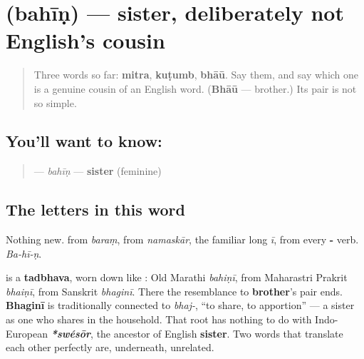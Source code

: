 \section[\texorpdfstring{\mr{बहीण} (bahīṇ)}{बहीण (bahīṇ)}]{ (bahīṇ) — sister, deliberately not English's cousin}

\label{lesson:MR-C11-bahin}



\begin{quote}
Three words so far: \textbf{mitra}, \textbf{kuṭumb}, \textbf{bhāū}. Say them, and say which one is a genuine cousin of an English word. (\textbf{Bhāū} — brother.) Its pair is not so simple.
\end{quote}

\subsection*{You'll want to know: }
\begin{quote}
\textbf{} — \emph{bahīṇ} — \textbf{sister} (feminine)
\end{quote}

\subsection*{The letters in this word}
Nothing new. \textbf{} from \emph{baraṃ}, \textbf{} from \emph{namaskār}, \textbf{} the familiar long \emph{ī}, \textbf{} from every \textbf{-} verb. \emph{Ba-hī-ṇ}.

\begin{cousinweb}
\textbf{} is a \textbf{tadbhava}, worn down like \textbf{}: Old Marathi \emph{bahiṇī}, from Maharastri Prakrit \emph{bhaiṇī}, from Sanskrit \textbf{} \emph{bhaginī}. There the resemblance to \textbf{brother}'s pair ends. \textbf{Bhaginī} is traditionally connected to \textbf{} \emph{bhaj-}, \textquotedblleft{}to share, to apportion\textquotedblright{} — a sister as one who shares in the household. That root has nothing to do with Indo-European \emph{\textbf{*swésōr}}, the ancestor of English \textbf{sister}. Two words that translate each other perfectly are, underneath, unrelated.
\end{cousinweb}

